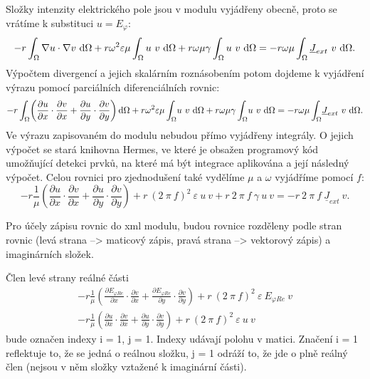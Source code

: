 \documentclass[12pt,a4paper,oneside]{article}
\numberwithin{equation}{section} %
\numberwithin{figure}{section} %
\numberwithin{table}{section} %
\newcommand{\faz}[1]{{\underline{#1}}} %
\begin{document}
Složky intenzity elektrického pole jsou v modulu vyjádřeny obecně, proto se vrátíme k substituci $u = E_\varphi$:
\begin{equation}
- r \int _{\Omega} \nabla u \cdot \nabla v ~ \ud \Omega + r \omega ^2 \varepsilon \mu \int _{\Omega} u ~ v ~ \ud \Omega + r \omega \mu \gamma \int _{\Omega} u ~ v ~ \ud \Omega = - r \omega \mu \int _{\Omega} \faz{J} _{ext} ~ v ~ \ud \Omega .
\end{equation}
Výpočtem divergencí a jejich skalárním roznásobením potom dojdeme k vyjádření výrazu pomocí parciálních diferenciálních rovnic:
\begin{equation}
- r \int _{\Omega} \! \left( \frac{\partial u}{\partial x} \cdot \frac{\partial v}{\partial x} + \frac{\partial u}{\partial y} \cdot \frac{\partial v}{\partial y} \right) \ud \Omega + r \omega ^2 \varepsilon \mu \int _{\Omega} \! u ~ v ~ \ud \Omega + r \omega \mu \gamma \int _{\Omega} \! u ~ v ~ \ud \Omega = - r \omega \mu \int _{\Omega} \! \faz{J} _{ext} ~ v ~ \ud \Omega .
\end{equation}
Ve výrazu zapisovaném do modulu nebudou přímo vyjádřeny integrály. O jejich výpočet se stará knihovna Hermes, ve které je obsažen programový kód umožňující detekci prvků, na které má být integrace aplikována a její následný výpočet. Celou rovnici pro zjednodušení také vydělíme $\mu$ a $\omega$ vyjádříme pomocí $f$:
\begin{equation}
- r \frac{1}{\mu} \left( \frac{\partial u}{\partial x} \cdot \frac{\partial v}{\partial x} + \frac{\partial u}{\partial y} \cdot \frac{\partial v}{\partial y} \right) + r ~ (2 ~ \pi ~ f) ^2 ~ \varepsilon ~ u ~ v + r ~ 2 ~ \pi ~ f ~ \gamma ~ u ~ v = - r ~ 2 ~ \pi ~ f ~ \faz{J} _{ext} ~ v .
\end{equation}

Pro účely zápisu rovnic do xml modulu, budou rovnice rozděleny podle stran rovnic (levá strana --> maticový zápis, pravá strana --> vektorový zápis) a imaginárních složek.

Člen levé strany reálné části
\begin{subequations}
\begin{gather}
- r \frac{1}{\mu} \left( \frac{\partial E _{\varphi Re}}{\partial x} \cdot \frac{\partial v}{\partial x} + \frac{\partial E _{\varphi Re}}{\partial y} \cdot \frac{\partial v}{\partial y} \right) + r ~ (2 ~ \pi ~ f) ^2 ~ \varepsilon ~ E _{\varphi Re} ~ v
\\
- r \frac{1}{\mu} \left( \frac{\partial u}{\partial x} \cdot \frac{\partial v}{\partial x} + \frac{\partial u}{\partial y} \cdot \frac{\partial v}{\partial y} \right) + r ~ (2 ~ \pi ~ f) ^2  ~ \varepsilon ~ u ~ v
\end{gather}
\end{subequations}
bude označen indexy i = 1, j = 1. Indexy udávají polohu v matici. Značení i = 1 reflektuje to, že se jedná o reálnou složku, j = 1 odráží to, že jde o plně reálný člen (nejsou v něm složky vztažené k imaginární části). 
\end{document}
